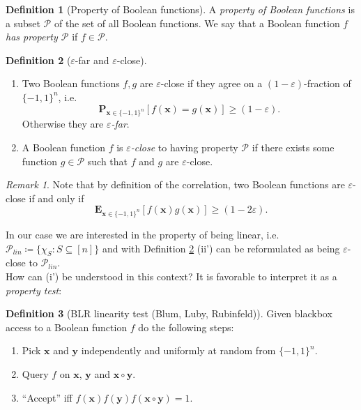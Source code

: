 \documentclass[a4paper]{article}
\newcommand{\prob}{\mathbf{P}}
\newcommand{\expe}{\mathbf{E}}
\newcommand{\prty}{\mathcal{P}}
\newcommand{\nset}{[n]}
\newcommand{\eps}{\varepsilon}
\newcommand{\boldx}{\boldsymbol{x}}
\newcommand{\boldy}{\boldsymbol{y}}
\theoremstyle{plain}
\theoremstyle{definition}
\newtheorem{definition}{Definition}
\theoremstyle{remark}
\newtheorem*{remark*}{Remark}
\begin{document}
\begin{definition}[Property of Boolean functions] \label{def:2}
  A \emph{property of Boolean functions} is a subset \(\prty\) of the
  set of all Boolean functions. We say that a Boolean function \(f\) \emph{has property \(\prty\)} if \(f
  \in \prty\). 
\end{definition}

\begin{definition}[\(\eps\)-far and \(\eps\)-close] \label{def:3}
  \begin{enumerate}[label=(\roman*)]
  \item Two Boolean functions \(f,g\) are \(\eps\)-close if they agree
    on a \((1-\eps)\)-fraction of \(\{-1,1\}^n\), i.e. 
    \[\prob_{\boldx\in\{-1,1\}^n}\left[f(\boldx) = g(\boldx)\right] \geq (1-\eps).\]
    Otherwise they are \emph{\(\eps\)-far}. 
  \item A Boolean function \(f\) is \emph{\(\eps\)-close} to having property
    \(\prty\) if there exists some function \(g\in \prty\) such that
    \(f\) and \(g\) are \(\eps\)-close. 
  \end{enumerate}
\end{definition}

\begin{remark*}
  Note that by definition of the correlation, two Boolean functions
  are \(\eps\)-close if and only if 
  \[\expe_{\boldx \in \{-1,1\}^n}\left[f(\boldx)g(\boldx)\right] \geq
  (1- 2\eps).\]  
\end{remark*}

\noindent In our case we are interested in the property of being
linear, i.e. \(\prty_{lin} \coloneqq \{\chi_S: S \subseteq
\nset\}\) and with Definition \ref{def:3} (ii') can be reformulated as
being \(\eps\)-close to \(\prty_{lin}\). \\

\noindent How can (i') be understood in this context? It is favorable to
interpret it as a \emph{property test}: 

\begin{definition}[\textsf{BLR} linearity test (Blum, Luby,
  Rubinfeld)] \label{def:4}
  Given blackbox access to a Boolean function \(f\) do the following
  steps: 
  \begin{enumerate}
  \item Pick \(\boldx\) and \(\boldy\) independently and uniformly at random
    from \(\{-1,1\}^n\).
  \item Query \(f\) on \(\boldx\), \(\boldy\) and \(\boldx \circ \boldy\).
  \item ``Accept'' iff \(f(\boldx)f(\boldy)f(\boldx \circ \boldy) = 1\). 
  \end{enumerate}
\end{definition}
\end{document}
